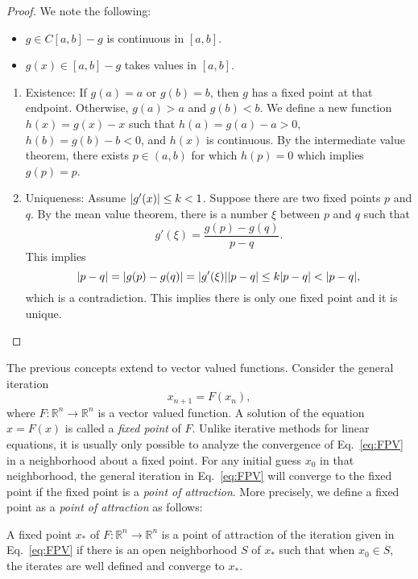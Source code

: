 \begin{proof}
We note the following:
	\begin{itemize}
		\item $g \in C[a,b] - g$ is continuous in $[a,b]$.
		\item $g(x) \in [a,b] - g$ takes values in $[a,b]$.
	\end{itemize}
	\begin{enumerate}
		\item Existence: If $g(a) = a$ or $g(b) = b$, then $g$ has a fixed point at that endpoint. Otherwise, $g(a) > a$ and $g(b) < b$. We define a new function $h(x) = g(x) - x$ such that $h(a) = g(a) - a > 0$, $h(b) = g(b) - b < 0$, and $h(x)$ is continuous. By the intermediate value theorem, there exists $p \in (a,b)$ for which $h(p) = 0$ which implies $g(p) = p$.
		\item Uniqueness: Assume $\lvert g'(x)\rvert \leq k < 1$. Suppose there are two fixed points $p$ and $q$. By the mean value theorem, there is a number $\xi$ between $p$ and $q$ such that
			\begin{equation}
				g'(\xi) = \frac{g(p) - g(q)}{p-q}.
			\end{equation}
			This implies
			\begin{equation}
				\lvert p-q\rvert = \lvert g(p) - g(q)\rvert = \lvert g'(\xi)\rvert\lvert p-q\rvert \leq k \lvert p-q\rvert < \lvert p-q\rvert,
			\end{equation}
			which is a contradiction. This implies there is only one fixed point and it is unique.
	\end{enumerate}
\end{proof}

The previous concepts extend to vector valued functions. Consider the general iteration
\begin{equation}
	x_{n+1} = F(x_{n}),
	\label{eq:FPV}
\end{equation}
where $F: \mathbb{R}^{n} \rightarrow \mathbb{R}^{n}$ is a vector valued function. A solution of the equation $x = F(x)$ is called a \textit{fixed point} of $F$. Unlike iterative methods for linear equations, it is usually only possible to analyze the convergence of Eq.~\ref{eq:FPV} in a neighborhood about a fixed point. For any initial guess $x_{0}$ in that neighborhood, the general iteration in Eq.~\ref{eq:FPV} will converge to the fixed point if the fixed point is a \textit{point of attraction}. More precisely, we define a fixed point as a \textit{point of attraction} as follows:

\begin{definition}
	A fixed point $x_{*}$ of $F: \mathbb{R}^{n} \rightarrow \mathbb{R}^{n}$ is a point of attraction of the iteration given in Eq.~\ref{eq:FPV} if there is an open neighborhood $S$ of $x_{*}$ such that when $x_{0} \in S$, the iterates are well defined and converge to $x_{*}$.
\end{definition}

